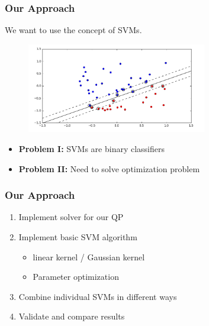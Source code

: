 \documentclass[12pt, compress]{beamer}
\newcommand{\titleB}{Our Approach}
\begin{document}
\begin{frame}
	\frametitle{\titleB}
	We want to use the concept of SVMs.
	
	\begin{figure}[h]
		\includegraphics[width=0.7\textwidth]{svm_examplegraphic}
	\end{figure}
	
	
	\begin{itemize}
		\item \textbf{Problem I:} SVMs are binary classifiers 
		\item \textbf{Problem II:} Need to solve optimization problem
	\end{itemize}

\end{frame}


\begin{frame}
	\frametitle{\titleB}
	\begin{enumerate}
		\item Implement solver for our QP
		\item Implement basic SVM algorithm
		\begin{itemize}
			\item linear kernel / Gaussian kernel
			\item Parameter optimization
		\end{itemize}
		\item Combine individual SVMs in different ways
		\item Validate and compare results 
		\
	\end{enumerate}
\end{frame}
\end{document}
